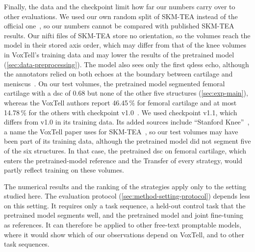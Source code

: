Finally, the data and the checkpoint limit how far our numbers carry over to other evaluations.
We used our own random split of SKM-TEA instead of the official one~\cite[Sec.~4.2]{desai2021skmtea}, so our numbers cannot be compared with published SKM-TEA results.
Our \gls{nifti} files of SKM-TEA store no orientation, so the volumes reach the model in their stored axis order, which may differ from that of the knee volumes in VoxTell's training data and may lower the results of the pretrained model (\cref{sec:data-preprocessing}).
The model also sees only the first \gls{qdess} echo, although the annotators relied on both echoes at the boundary between cartilage and meniscus~\cite[App.~A.4]{desai2021skmtea}.
On our test volumes, the pretrained model segmented femoral cartilage with a \gls{dsc} of 0.68 but none of the other five structures (\cref{sec:exp-main}), whereas the VoxTell authors report 46.45\,\% for femoral cartilage and at most 14.78\,\% for the others with checkpoint v1.0~\cites[Suppl.~Table~9]{rokuss2025voxtellfreetextpromptableuniversal}{rokuss2026voxtellmodelcard}.
We used checkpoint v1.1, which differs from v1.0 in its training data.
Its added sources include ``Stanford Knee''~\cite{rokuss2026voxtellissue15}, a name the VoxTell paper uses for SKM-TEA~\cite[Sec.~6]{rokuss2025voxtellfreetextpromptableuniversal}, so our test volumes may have been part of its training data, although the pretrained model did not segment five of the six structures.
In that case, the pretrained \gls{dsc} on femoral cartilage, which enters the pretrained-model reference and the Transfer of every strategy, would partly reflect training on these volumes.

The numerical results and the ranking of the strategies apply only to the setting studied here.
The evaluation protocol (\cref{sec:method-setting-protocol}) depends less on this setting.
It requires only a task sequence, a held-out control task that the pretrained model segments well, and the pretrained model and joint fine-tuning as references.
It can therefore be applied to other free-text promptable models, where it would show which of our observations depend on VoxTell, and to other task sequences.
